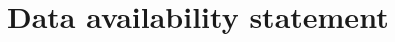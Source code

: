 \documentclass[12pt]{article}
\begin{document}


\section*{Data availability statement}
\end{document}
